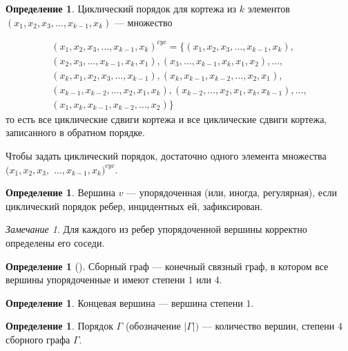 \documentclass[a4paper,fleqn,12pt,top=0pt]{article}
\theoremstyle{plain}
\theoremstyle{definition}
\newtheorem{definition}[theorem]{Определение}
\theoremstyle{remark}
\newtheorem{remark}[theorem]{Замечание}
\begin{document}
\begin{definition}
    Циклический порядок для кортежа из $k$ элементов $(x_1, x_2, x_3, \dots, x_{k - 1}, x_k)$ --- множество 
    
    \begin{gather*}
    (x_1, x_2, x_3, \dots, x_{k - 1}, x_k)^{cyc} = \{
    (x_1, x_2, x_3, \dots, x_{k - 1}, x_k), \\
    (x_2, x_3, \dots, x_{k - 1}, x_k, x_1),
    (x_3, \dots, x_{k - 1}, x_k, x_1, x_2), \dots, \\
    (x_k, x_1, x_2, x_3, \dots, x_{k - 1}),
    (x_k, x_{k - 1}, x_{k - 2}, \dots, x_2, x_1), \\
    (x_{k - 1}, x_{k - 2}, \dots, x_2, x_1, x_k),
    (x_{k - 2}, \dots, x_2, x_1, x_k, x_{k - 1}), \dots, \\
    (x_1, x_k, x_{k - 1}, x_{k - 2}, \dots, x_2)
    \}
    \end{gather*}
    то есть все циклические сдвиги кортежа и все циклические сдвиги кортежа, записанного в обратном порядке.
    
    Чтобы задать циклический порядок, достаточно одного элемента множества $(x_1, x_2, x_3,$ $\dots, x_{k - 1}, x_k)^{cyc}$.
\end{definition}

\begin{definition}
    Вершина $v$ --- упорядоченная (или, иногда, регулярная), если циклический порядок ребер, инцидентных ей, зафиксирован.
\end{definition}

\begin{remark}
    Для каждого из ребер упорядоченной вершины корректно определены его соседи.
\end{remark}

\begin{definition}[]
    Сборный граф --- конечный связный граф, в котором все вершины упорядоченные и имеют степени $1$ или $4$.
\end{definition}

\begin{definition}
    Концевая вершина --- вершина степени $1$.
\end{definition}

\begin{definition}
    Порядок $\Gamma$ (обозначение $|\Gamma|)$ --- количество вершин, степени $4$ сборного графа $\Gamma$.
\end{definition}
\end{document}
